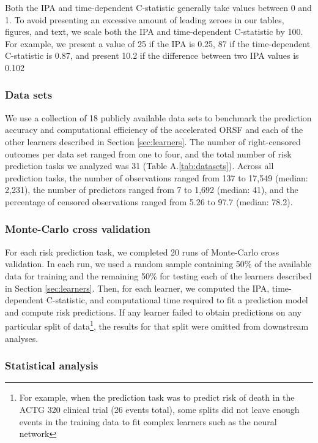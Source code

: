 \documentclass[twoside,11pt]{article}\usepackage[]{graphicx}\usepackage[]{xcolor}
\newcommand{\secref}[1]{Section \ref{#1}}
\newcommand{\tabrefAppendix}[1]{Table A.\ref{#1}}
\begin{document}
Both the IPA and time-dependent C-statistic generally take values between 0 and 1. To avoid presenting an excessive amount of leading zeroes in our tables, figures, and text, we scale both the IPA and time-dependent C-statistic by 100. For example, we present a value of 25 if the IPA is 0.25, 87 if the time-dependent C-statistic is 0.87, and present 10.2 if the difference between two IPA values is 0.102

\subsubsection{Data sets}

We use a collection of 18 publicly available data sets to benchmark the prediction accuracy and computational efficiency of the accelerated ORSF and each of the other learners described in \secref{sec:learners}. The number of right-censored outcomes per data set ranged from one to four, and the total number of risk prediction tasks we analyzed was 31 (\tabrefAppendix{tab:datasets}). Across all prediction tasks, the number of observations ranged from 137 to 17,549 (median: 2,231), the number of predictors ranged from 7 to 1,692 (median: 41), and the percentage of censored observations ranged from 5.26 to 97.7 (median: 78.2).

\subsubsection{Monte-Carlo cross validation}

For each risk prediction task, we completed 20 runs of Monte-Carlo cross validation. In each run, we used a random sample containing 50\% of the available data for training and the remaining 50\% for testing each of the learners described in \secref{sec:learners}. Then, for each learner, we computed the IPA, time-dependent C-statistic, and computational time required to fit a prediction model and compute risk predictions. If any learner failed to obtain predictions on any particular split of data\footnote{For example, when the prediction task was to predict risk of death in the ACTG 320 clinical trial (26 events total), some splits did not leave enough events in the training data to fit complex learners such as the neural network}, the results for that split were omitted from downstream analyses.


\subsubsection{Statistical analysis}
\end{document}
